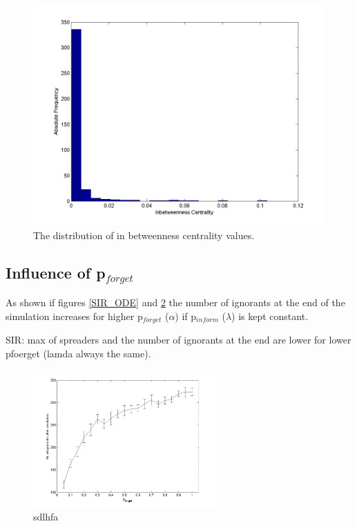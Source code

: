 \begin{figure}[H!]
\includegraphics[scale=0.4]{network_centralityhist.png}
\caption{The distribution of in betweenness centrality values.}
\label{centrality}
\end{figure}


\subsection{Influence of p$_{forget}$}
As shown if figures \ref{SIR_ODE} and \ref{Analysis_pforget} the number of ignorants at the end of the simulation increases for higher p$_{forget}$ ($\alpha$)  if p$_{inform}$ ($\lambda$) is kept constant.

SIR: max of spreaders and the number of ignorants at the end are lower for lower pfoerget (lamda always the same).

\begin{figure}[H!]
\includegraphics[width=7cm]{Analysis_pforget}
\caption{sdlhfa}
\label{Analysis_pforget}
\end{figure}

